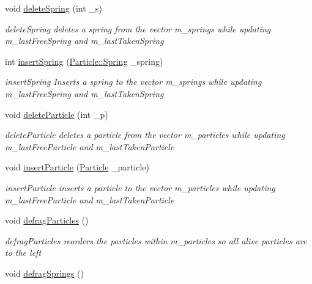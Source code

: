 \begin{DoxyCompactItemize}
void \hyperlink{classWorld_a5b90e83051311490ea6e9a7862cb7aae}{delete\-Spring} (int \-\_\-s)
\begin{DoxyCompactList}\small\item\em delete\-Spring deletes a spring from the vector m\-\_\-springs while updating m\-\_\-last\-Free\-Spring and m\-\_\-last\-Taken\-Spring \end{DoxyCompactList}\item 
int \hyperlink{classWorld_ad28f7d1bd3a6b181513ce92d0b76a9d6}{insert\-Spring} (\hyperlink{structParticle_1_1spring}{Particle\-::\-Spring} \-\_\-spring)
\begin{DoxyCompactList}\small\item\em insert\-Spring Inserts a spring to the vector m\-\_\-springs while updating m\-\_\-last\-Free\-Spring and m\-\_\-last\-Taken\-Spring \end{DoxyCompactList}\item 
void \hyperlink{classWorld_ae1850c34d62127f1864c0c031e882c63}{delete\-Particle} (int \-\_\-p)
\begin{DoxyCompactList}\small\item\em delete\-Particle deletes a particle from the vector m\-\_\-particles while updating m\-\_\-last\-Free\-Particle and m\-\_\-last\-Taken\-Particle \end{DoxyCompactList}\item 
void \hyperlink{classWorld_aa962526ce57792d47848c5dc24530097}{insert\-Particle} (\hyperlink{classParticle}{Particle} \-\_\-particle)
\begin{DoxyCompactList}\small\item\em insert\-Particle inserts a particle to the vector m\-\_\-particles while updating m\-\_\-last\-Free\-Particle and m\-\_\-last\-Taken\-Particle \end{DoxyCompactList}\item 
\hypertarget{classWorld_abf37c2bf5e92f910a963153f46f9af41}{void \hyperlink{classWorld_abf37c2bf5e92f910a963153f46f9af41}{defrag\-Particles} ()}\label{classWorld_abf37c2bf5e92f910a963153f46f9af41}

\begin{DoxyCompactList}\small\item\em defrag\-Particles reorders the particles within m\-\_\-particles so all alive particles are to the left \end{DoxyCompactList}\item 
\hypertarget{classWorld_a3036437a8edfd623efa899e1ee9438a0}{void \hyperlink{classWorld_a3036437a8edfd623efa899e1ee9438a0}{defrag\-Springs} ()}\label{classWorld_a3036437a8edfd623efa899e1ee9438a0}


\end{DoxyCompactItemize}
